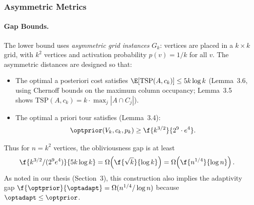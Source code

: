 \subsubsection{Asymmetric Metrics}

\paragraph{Gap Bounds.}

\begin{center}
\renewcommand{\arraystretch}{1.4}
\end{center}

\begin{remark}
    The lower bound uses \emph{asymmetric grid instances} $G_k$: vertices are placed in a $k \times k$ grid, with $k^2$ vertices and activation probability $p(v) = 1/k$ for all $v$. The asymmetric distances are designed so that:
    \begin{itemize}
        \item The optimal a posteriori cost satisfies
        $\E[\text{TSP}(A, c_k)] \le 5k \log k$
        (Lemma~3.6, using Chernoff bounds on the maximum column occupancy;
        Lemma~3.5 shows
        $\text{TSP}(A, c_k) = k \cdot \max_j |A \cap C_j|$).
        \item The optimal a priori tour satisfies (Lemma~3.4):
        \[
            \optprior(V_k, c_k, p_k) \ge \f{k^{3/2}}{2^9 \cdot e^4}.
        \]
    \end{itemize}
    Thus for $n = k^2$ vertices, the obliviousness gap is at least
    \[
        \f{k^{3/2}/(2^9 e^4)}{5k \log k} = \Omega\!\left(\f{\sqrt{k}}{\log k}\right) = \Omega\!\left(\f{n^{1/4}}{\log n}\right).
    \]
    As noted in our thesis (Section~3), this construction also implies the adaptivity gap $\f{\optprior}{\optadapt} = \Omega(n^{1/4} / \log n)$ because $\optadapt \le \optprior$.
\end{remark}


